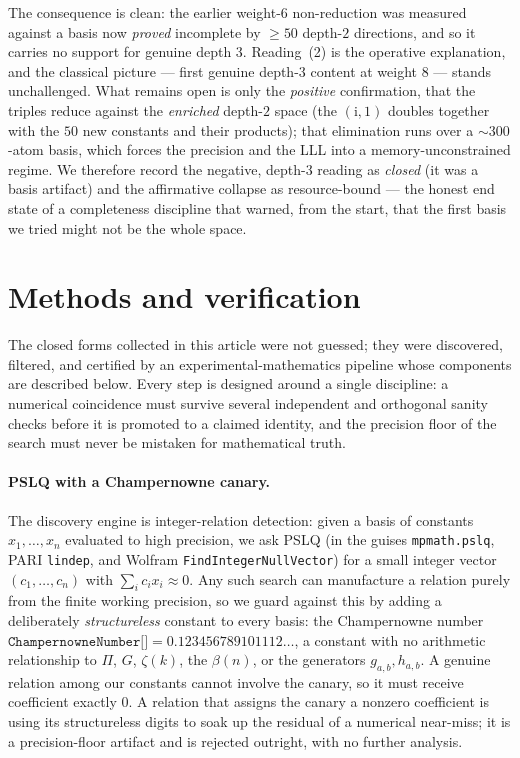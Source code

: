 \documentclass[11pt]{article}
\newcommand{\iu}{\mathrm{i}}
\theoremstyle{plain}
\theoremstyle{remark}
\begin{document}
The consequence is clean: the earlier weight-$6$ non-reduction was measured against a basis now \emph{proved} incomplete by $\ge 50$ depth-$2$ directions, and so it carries no support for genuine depth $3$. Reading~(2) is the operative explanation, and the classical picture --- first genuine depth-$3$ content at weight $8$ --- stands unchallenged. What remains open is only the \emph{positive} confirmation, that the triples reduce against the \emph{enriched} depth-$2$ space (the $(\iu,1)$ doubles together with the $50$ new constants and their products); that elimination runs over a $\sim\!300$-atom basis, which forces the precision and the LLL into a memory-unconstrained regime. We therefore record the negative, depth-$3$ reading as \emph{closed} (it was a basis artifact) and the affirmative collapse as resource-bound --- the honest end state of a completeness discipline that warned, from the start, that the first basis we tried might not be the whole space.


\section{Methods and verification}\label{sec:methods}

The closed forms collected in this article were not guessed; they were discovered, filtered, and certified by an experimental-mathematics pipeline whose components are described below. Every step is designed around a single discipline: a numerical coincidence must survive several independent and orthogonal sanity checks before it is promoted to a claimed identity, and the precision floor of the search must never be mistaken for mathematical truth.

\paragraph{PSLQ with a Champernowne canary.}
The discovery engine is integer-relation detection: given a basis of constants $x_1,\dots,x_n$ evaluated to high precision, we ask PSLQ (in the guises \texttt{mpmath.pslq}, PARI \texttt{lindep}, and Wolfram \texttt{FindIntegerNullVector}) for a small integer vector $(c_1,\dots,c_n)$ with $\sum_i c_i x_i \approx 0$. Any such search can manufacture a relation purely from the finite working precision, so we guard against this by adding a deliberately \emph{structureless} constant to every basis: the Champernowne number $\texttt{ChampernowneNumber[]} = 0.123456789101112\ldots$, a constant with no arithmetic relationship to $\Pi$, $G$, $\zeta(k)$, the $\beta(n)$, or the generators $g_{a,b},h_{a,b}$. A genuine relation among our constants cannot involve the canary, so it must receive coefficient exactly $0$. A relation that assigns the canary a nonzero coefficient is using its structureless digits to soak up the residual of a numerical near-miss; it is a precision-floor artifact and is rejected outright, with no further analysis.
\end{document}
